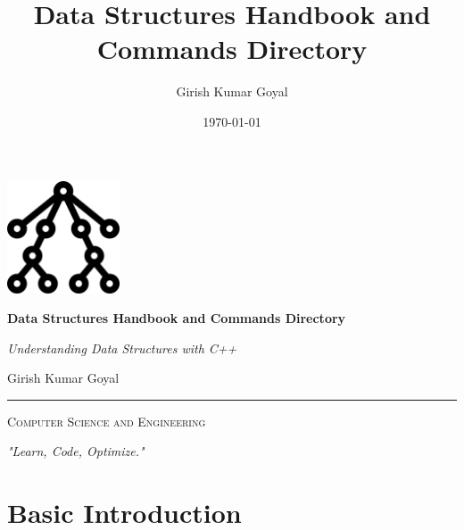 \documentclass[twoside, 12pt, a4paper, english, openany]{book}
\title{Data Structures Handbook and Commands Directory}
\author{Girish Kumar Goyal}
\date{\today}
\begin{document}
\frontmatter

\begin{titlepage}
    \centering
    \vspace*{1.5cm}

    \includegraphics[width=0.25\textwidth]{images/logo.png}\par\vspace{1cm}

    {\Huge\bfseries\color{blue!30!black} Data Structures Handbook and Commands Directory\par}
    \vspace{0.5cm}
    {\Large\itshape\color{gray!70!black} Understanding Data Structures with C++\par}
    \vspace{2cm}

    {\LARGE\color{black!85!blue} Girish Kumar Goyal \par}
    \vspace{1.2cm}

    \rule{\textwidth}{0.5pt}
    \vspace{0.3cm}

    {\large\scshape Computer Science and Engineering\par}
    \vspace{0.5cm}

    \vfill

    {\large\itshape "Learn, Code, Optimize." \par}
\end{titlepage}



\tableofcontents
\listoffigures
\listoftables

\mainmatter
{}
\setcounter{page}{1}

\part{Basic Introduction}






\end{document}
